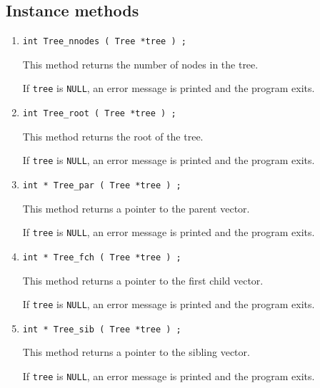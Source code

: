 \subsection{Instance methods}
\label{subsection:Tree:proto:instance}
\par
\begin{enumerate}
\item
\begin{verbatim}
int Tree_nnodes ( Tree *tree ) ;
\end{verbatim}
This method returns the number of nodes in the tree.
\par {}
If {\tt tree} is {\tt NULL},
an error message is printed and the program exits.
\item
\begin{verbatim}
int Tree_root ( Tree *tree ) ;
\end{verbatim}
This method returns the root of the tree.
\par {}
If {\tt tree} is {\tt NULL},
an error message is printed and the program exits.
\item
\begin{verbatim}
int * Tree_par ( Tree *tree ) ;
\end{verbatim}
This method returns a pointer to the parent vector.
\par {}
If {\tt tree} is {\tt NULL},
an error message is printed and the program exits.
\item
\begin{verbatim}
int * Tree_fch ( Tree *tree ) ;
\end{verbatim}
This method returns a pointer to the first child vector.
\par {}
If {\tt tree} is {\tt NULL},
an error message is printed and the program exits.
\item
\begin{verbatim}
int * Tree_sib ( Tree *tree ) ;
\end{verbatim}
This method returns a pointer to the sibling vector.
\par {}
If {\tt tree} is {\tt NULL},
an error message is printed and the program exits.
\end{enumerate}
\par
